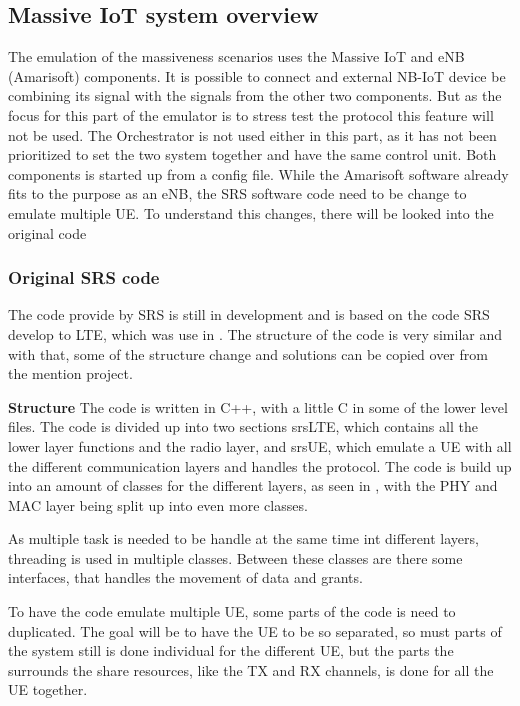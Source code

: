 \subsection{Massive IoT system overview}

The emulation of the massiveness scenarios uses the Massive IoT and eNB (Amarisoft) components. It is possible to connect and external NB-IoT device be combining its signal with the signals from the other two components. But as the focus for this part of the emulator is to stress test the protocol this feature will not be used. The Orchestrator is not used either in this part, as it has not been prioritized to set the two system together and have the same control unit. Both components is started up from a config file. While the Amarisoft software already fits to the purpose as an eNB, the SRS software code need to be change to emulate multiple UE. To understand this changes, there will be looked into the original code

\subsubsection{Original SRS code}
The code provide by SRS is still in development and is based on the code SRS develop to LTE, which was use in . The structure of the code is very similar and with that, some of the structure change and solutions can be copied over from the mention project.

\textbf{Structure}
The code is written in C++, with a little C in some of the lower level files. The code is divided up into two sections srsLTE, which contains all the lower layer functions and the radio layer, and srsUE, which emulate a UE with all the different communication layers and handles the protocol. The code is build up into an amount of classes for the different layers, as seen in , with the PHY and MAC layer being split up into even more classes.



As multiple task is needed to be handle at the same time int different layers, threading is used in multiple classes.  Between these classes are there some interfaces, that handles the movement of data and grants.

To have the code emulate multiple UE, some parts of the code is need to duplicated. The goal will be to have the UE to be so separated, so must parts of the system still is done individual for the different UE, but the parts the surrounds the share resources, like the TX and RX channels, is done for all the UE together.
